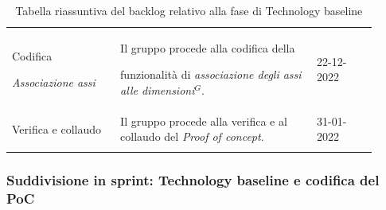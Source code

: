 {\begin{longtable}{p{0.27\linewidth}p{0.49\linewidth}p{0.15\linewidth}}
    \rowcolor[RGB]{216, 235, 171}
    Codifica \par \textit{Associazione assi} & Il gruppo procede alla codifica della \par funzionalità di \textit{associazione degli assi alle dimensioni$^{G}$}. & 22-12-2022\\

    \rowcolor[RGB]{233, 245, 206}
    Verifica e collaudo & Il gruppo procede alla verifica e al collaudo del \textit{Proof of concept}. & 31-01-2022\\

    \caption{Tabella riassuntiva del backlog relativo alla fase di Technology baseline}
\end{longtable}
}

\subsubsection{Suddivisione in sprint: Technology baseline e codifica del PoC}
